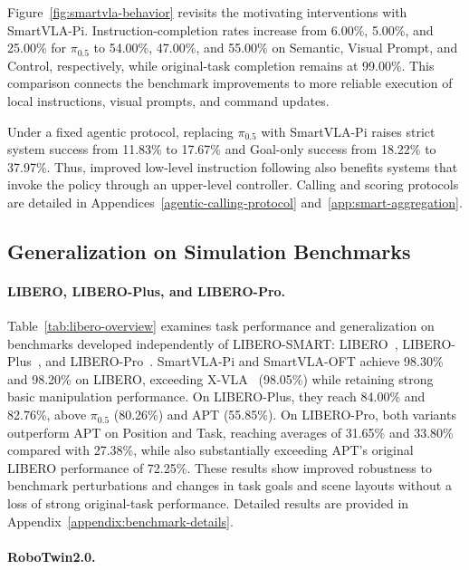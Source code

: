 Figure~\ref{fig:smartvla-behavior} revisits the motivating interventions with SmartVLA-Pi.
Instruction-completion rates increase from 6.00\%, 5.00\%, and 25.00\% for $\pi_{0.5}$ to 54.00\%,
47.00\%, and 55.00\% on Semantic, Visual Prompt, and Control, respectively, while original-task
completion remains at 99.00\%. This comparison connects the benchmark improvements to more reliable
execution of local instructions, visual prompts, and command updates.

Under a fixed agentic protocol, replacing $\pi_{0.5}$ with SmartVLA-Pi raises strict system success
from 11.83\% to 17.67\% and Goal-only success from 18.22\% to 37.97\%. Thus, improved low-level
instruction following also benefits systems that invoke the policy through an upper-level
controller. Calling and scoring protocols are detailed in Appendices~\ref{agentic-calling-protocol}
and~\ref{app:smart-aggregation}.

\subsection{Generalization on Simulation Benchmarks}\label{simulation-benchmarks}

\paragraph{LIBERO, LIBERO-Plus, and LIBERO-Pro.}\label{libero-benchmarks}

%

Table~\ref{tab:libero-overview} examines task performance and generalization on benchmarks developed
independently of LIBERO-SMART: LIBERO~\citep{liu2023libero},
LIBERO-Plus~\citep{fei2025liberoplus}, and LIBERO-Pro~\citep{zhou2025liberopro}.
SmartVLA-Pi and SmartVLA-OFT achieve 98.30\% and 98.20\% on LIBERO,
exceeding X-VLA~\citep{zheng2025xvla} (98.05\%) while retaining strong basic manipulation
performance. On LIBERO-Plus, they reach 84.00\% and 82.76\%, above $\pi_{0.5}$ (80.26\%) and APT
(55.85\%). On LIBERO-Pro, both variants outperform APT on Position and Task, reaching averages of
31.65\% and 33.80\% compared with 27.38\%, while also substantially exceeding APT's original LIBERO
performance of 72.25\%. These results show improved robustness to benchmark perturbations and
changes in task goals and scene layouts without a loss of strong original-task performance. Detailed
results are provided in Appendix~\ref{appendix:benchmark-details}.

\paragraph{RoboTwin2.0.}\label{robotwin2.0}

